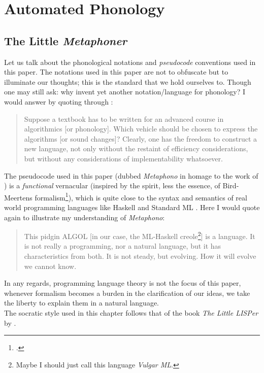 \documentclass{report}[12pt]
\begin{document}
\part{Automated Phonology}

\chapter{The Little \emph{Metaphoner}}

Let us talk about the phonological notations and \emph{pseudocode} conventions used in this paper. The notations used in this paper are not to obfuscate but to illuminate our thoughts; this is the standard that we hold ourselves to. Though one may still ask: why invent yet another notation/language for phonology? I would answer by quoting \cite{abstracto} through \cite[p.~14]{squiggol}:
\begin{quote}
  Suppose a textbook has to be written for an advanced course in algorithmics [or phonology]. Which vehicle should be chosen to express the algorithms [or sound changes]? Clearly, one has the freedom to construct a new language, not only without the restaint of efficiency considerations, but without any considerations of implementability whatsoever.
\end{quote}
The pseudocode used in this paper (dubbed \emph{Metaphono} in homage to the work of \cite{hartman_phono}) is a \emph{functional} vernacular (inspired by the spirit, less the essence, of Bird-Meertens formalism\footcite{bird_moor, squiggol, bird_meertens_book}), which is quite close to the syntax and semantics of real world programming languages like Haskell \parencite{haskell2010} and Standard ML \parencite{def_sml}. Here I would quote \cite[p.~57]{abstracto} again to illustrate my understanding of \emph{Metaphono}:
\begin{quote}
  This pidgin ALGOL [in our case, the ML-Haskell creole\footnote{Maybe I should just call this language \emph{Vulgar ML}.}] is a language. It is not really a programming, nor a natural language, but it has characteristics from both. It is not steady, but evolving. How it will evolve we cannot know.
\end{quote}
In any regards, programming language theory is not the focus of this paper, whenever formalism becomes a burden in the clarification of our ideas, we take the liberty to explain them in a natural language. \\
The socratic style used in this chapter follows that of the book \emph{The Little LISPer} by \cite{lisper}.
\end{document}
